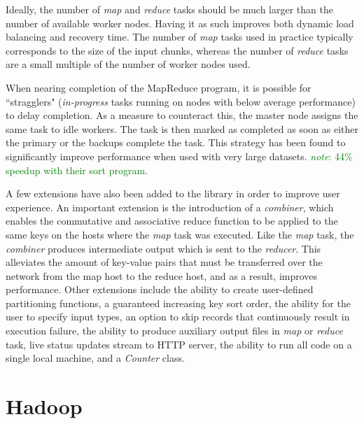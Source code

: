 \documentclass{report}
\newcommand{\note}[1]{\textcolor{green}{\textit{note}: #1}}
\begin{document}
Ideally, the number of \textit{map} and \textit{reduce} tasks should be much larger than the number of available worker nodes. Having it as such improves both dynamic load balancing and recovery time. The number of \textit{map} tasks used in practice typically corresponds to the size of the input chunks, whereas the number of \textit{reduce} tasks are a small multiple of the number of worker nodes used.

When nearing completion of the MapReduce program, it is possible for  ``stragglers" (\textit{in-progress} tasks running on nodes with below average performance) to delay completion. As a measure to counteract this, the master node assigns the same task to idle workers. The task is then marked as completed as soon as either the primary or the backups complete the task. This strategy has been found to significantly improve performance when used with very large datasets. \note{44\% speedup with their sort program}.

A few extensions have also been added to the library in order to improve user experience. An important extension is the introduction of a \textit{combiner}, which enables the commutative and associative reduce function to be applied to the same keys on the hosts where the \textit{map} task was executed. Like the \textit{map} task, the \textit{combiner} produces intermediate output which is sent to the \textit{reducer}. This alleviates the amount of key-value pairs that must be transferred over the network from the map host to the reduce host, and as a result, improves performance. Other extensions include the ability to create user-defined partitioning functions, a guaranteed increasing key sort order, the ability for the user to specify input types, an option to skip records that continuously result in execution failure, the ability to produce auxiliary output files in \textit{map} or \textit{reduce} task, live status updates stream to HTTP server,  the ability to run all code on a single local machine, and a \textit{Counter} class.


















\section{Hadoop}
\cite{hadoop}
\end{document}
